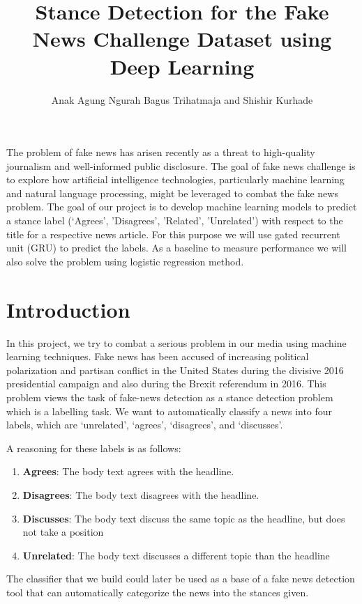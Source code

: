 \documentclass[12pt]{article}
\title{Stance Detection for the Fake News Challenge Dataset using Deep Learning}
\author{Anak Agung Ngurah Bagus Trihatmaja and Shishir Kurhade}
\date{}
\begin{document}
\maketitle

\abstract
The problem of fake news has arisen recently as a threat to high-quality 
journalism and well-informed public disclosure. The goal of fake news 
challenge is to explore how artificial intelligence technologies, particularly
machine learning and natural language processing, might be leveraged to combat 
the fake news problem. The goal of our project is to develop machine learning 
models to predict a stance label (‘Agrees’, ’Disagrees’, ’Related’, ’Unrelated’) 
with respect to the title for a respective news article. For this purpose we 
will use gated recurrent unit (GRU) to predict the labels. As a baseline to 
measure performance we will also solve the problem using logistic regression method.


\section{Introduction}
In this project, we try to combat a serious problem in our media using machine 
learning techniques. Fake news has been accused of increasing political polarization 
and partisan conflict in the United States during the divisive 2016 
presidential campaign and also during the Brexit referendum in 2016.
This problem views the task of fake-news detection as a stance detection problem 
which is a labelling task. We want to automatically classify a news into four labels, 
which are ‘unrelated’, ‘agrees’, ‘disagrees’, and ‘discusses’.  

A reasoning for these labels is as follows:
\begin{enumerate}
  \item \textbf{Agrees}: The body text agrees with the headline.
  \item \textbf{Disagrees}: The body text disagrees with the headline.
  \item \textbf{Discusses}: The body text discuss the same topic as the headline, 
    but does not take a position
  \item \textbf{Unrelated}: The body text discusses a different topic than the headline
\end{enumerate}

The classifier that we build could later be used as a base of a 
fake news detection tool that can automatically categorize the news into the 
stances given.
\end{document}
